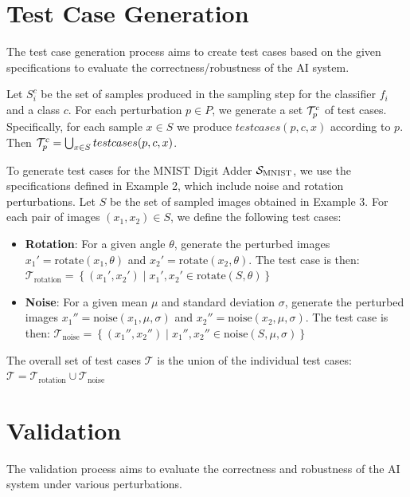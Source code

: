 \section{Test Case Generation}

The test case generation process aims to create test cases based on the given specifications to evaluate the correctness/robustness of the AI system.

Let $S_i^c$ be the set of samples produced in the sampling step for the classifier $f_i$ and a class $c$. For each perturbation $p\in P$, we generate a set $\T_p^c$ of test cases. Specifically, for each sample $x\in S$ we produce $testcases(p,c,x)$ according to $p$. Then $\T_p^c = \bigcup_{x\in S} testcases(p,c,x)$.

\begin{example}
To generate test cases for the MNIST Digit Adder $\S_{\text{MNIST}}$, we use the specifications defined in Example 2, which include noise and rotation perturbations. Let $S$ be the set of sampled images obtained in Example 3. For each pair of images $(x_1, x_2) \in S$, we define the following test cases:
\begin{itemize}
    \item \textbf{Rotation}: For a given angle $\theta$, generate the perturbed images $x_1' = \text{rotate}(x_1, \theta)$ and $x_2' = \text{rotate}(x_2, \theta)$. The test case is then:
    $\mathcal{T}_{\text{rotation}} = \left\{(x_1', x_2') \mid x_1', x_2' \in \text{rotate}(S, \theta)\right\}$
    \item \textbf{Noise}: For a given mean $\mu$ and standard deviation $\sigma$, generate the perturbed images $x_1'' = \text{noise}(x_1, \mu, \sigma)$ and $x_2'' = \text{noise}(x_2, \mu, \sigma)$. The test case is then:
    $\mathcal{T}_{\text{noise}} = \left\{(x_1'', x_2'') \mid x_1'', x_2'' \in \text{noise}(S, \mu, \sigma)\right\}$
\end{itemize}
The overall set of test cases $\mathcal{T}$ is the union of the individual test cases:
$\mathcal{T} = \mathcal{T}_{\text{rotation}} \cup \mathcal{T}_{\text{noise}}$
\end{example}

\section{Validation}

The validation process aims to evaluate the correctness and robustness of the AI system under various perturbations.

